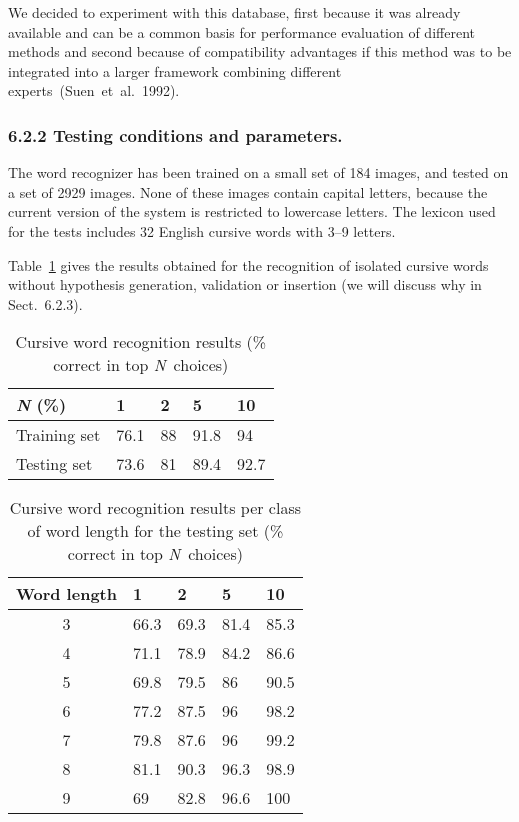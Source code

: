 \documentclass[ijdar]{svjour}
\begin{document}
We decided to experiment with this database, first because it was
already available and can be a common basis for performance evaluation
of different methods and second because of \mbox{compatibility}
advantages if this method was to be integrated into a larger framework
combining different \mbox{experts~(Suen et al. 1992)}.

\subsubsection{6.2.2 Testing conditions and parameters.}


The word recognizer has been trained on a small set of 184 images, and tested on a set of 2929 images.
None of these images contain capital letters, because the current version of the system is restricted to lowercase letters.
The lexicon used for the tests includes 32 English cursive words with
3--9 letters.

Table~\ref{RECOMOT} gives the results obtained for the recognition of isolated cursive words without hypothesis generation, validation or insertion (we will discuss why in
Sect.~6.2.3).



\begin{table}%
\caption{Cursive word recognition results (\% correct in top {\it N}~choices)}
\label{RECOMOT}
\begin{tabular}{l l l l l }
\hline
{\it N} (\%)            &1      &2      &5      &10     \\
\hline
Training set            &76.1   &88     &91.8   &94     \\
Testing set             &73.6   &81     &89.4   &92.7   \\
\hline
\end{tabular}
\end{table}


\begin{table}%
\caption{Cursive word recognition results per class of word length for
the testing set (\% correct in top {\it N}~choices)}
\label{REPARTRECO}
\begin{tabular}{c l l l l }
\hline
Word length     &1      &2      &5      &10     \\
\hline
3               &66.3   &69.3   &81.4   &85.3   \\
4               &71.1   &78.9   &84.2   &86.6   \\
5               &69.8   &79.5   &86     &90.5   \\
6               &77.2   &87.5   &96     &98.2   \\
7               &79.8   &87.6   &96     &99.2   \\
8               &81.1   &90.3   &96.3   &98.9   \\
9               &69     &82.8   &96.6   &100    \\
\hline
\end{tabular}
\end{table}
\end{document}
